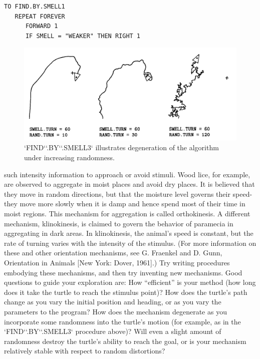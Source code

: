 \documentclass{book}
\begin{document}
\begin{verbatim}
TO FIND.BY.SMELL1
   REPEAT FOREVER
      FORWARD 1
      IF SMELL = "WEAKER" THEN RIGHT 1
\end{verbatim}
\begin{figure}
\begin{center}
\includegraphics[scale=1]{fig2-4}
\caption{\textsc{`FIND`}\textsc{`.BY`}\textsc{`.SMELL3`} illustrates degeneration of the algorithm under increasing randomness.}
\end{center}
\end{figure}

such intensity information to approach or avoid stimuli. Wood lice, for
example, are observed to aggregate in moist places and avoid dry places.
It is believed that they move in random directions, but that the moisture
level governs their speed-they move more slowly when it is damp and
hence spend most of their time in moist regions. This mechanism for
aggregation is called orthokinesis. A different mechanism, klinokinesis,
is claimed to govern the behavior of paramecia in aggregating in dark
areas. In klinokinesis, the animal's speed is constant, but the rate of
turning varies with the intensity of the stimulus. (For more information on these and other orientation mechanisms, see G. Fraenkel and
D. Gunn, Orientation in Animals [New York: Dover, 1961].) Try writing procedures embodying these mechanisms, and then try inventing
new mechanisms. Good questions to guide your exploration are: How
``efficient'' is your method (how long does it take the turtle to reach the
stimulus point)? How does the turtle's path change as you vary the initial position and heading, or as you vary the parameters to the program?
How does the mechanism degenerate as you incorporate some randomness into the turtle's motion (for example, as in the \textsc{`FIND`}\textsc{`.BY`}\textsc{`.SMELL3`}
procedure above)? Will even a slight amount of randomness destroy the
turtle's ability to reach the goal, or is your mechanism relatively stable
with respect to random distortions?
\end{document}
